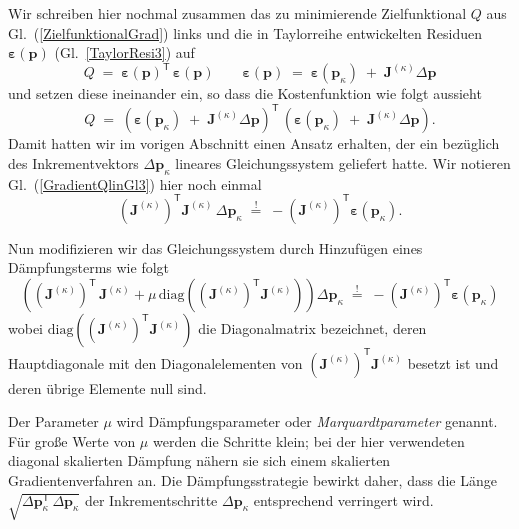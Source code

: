 Wir schreiben hier nochmal zusammen das zu minimierende Zielfunktional $Q$ aus Gl.~(\ref{ZielfunktionalGrad}) links
und die in Taylorreihe entwickelten Residuen $\boldsymbol{\varepsilon}(\mathbf{p})$
(Gl.~\ref{TaylorResi3}) auf
$$
Q \; = \; \boldsymbol{\varepsilon}(\mathbf{p})^\mathsf{T} \, \boldsymbol{\varepsilon}(\mathbf{p})
\qquad
\boldsymbol{\varepsilon}(\mathbf{p})
\; = \;
\boldsymbol{\varepsilon}(\mathbf{p}_\kappa)
\; + \; \boldsymbol{J}^{(\kappa)} \Delta \mathbf{p}
$$
und setzen diese ineinander ein, so dass die Kostenfunktion wie folgt aussieht
\begin{equation}
Q \; = \; \left( \boldsymbol{\varepsilon}(\mathbf{p}_\kappa)
\; + \; \boldsymbol{J}^{(\kappa)} \Delta \mathbf{p} \right)^\mathsf{T} \,
\left( \boldsymbol{\varepsilon}(\mathbf{p}_\kappa)
\; + \; \boldsymbol{J}^{(\kappa)} \Delta \mathbf{p} \right) .
\label{ZielfunktionalTaylorResi}
\end{equation}
Damit hatten wir im vorigen Abschnitt einen Ansatz erhalten, der
ein bezüglich des Inkrementvektors $\Delta \mathbf{p}_\kappa$ lineares Gleichungssystem
geliefert hatte. Wir notieren Gl.~(\ref{GradientQlinGl3}) hier noch einmal
\begin{equation*}
 \left(\boldsymbol{J}^{(\kappa)}\right)^\mathsf{T}
 \boldsymbol{J}^{(\kappa)} \, \Delta \mathbf{p}_\kappa
\; \overset{!}{=} \;
- \left(\boldsymbol{J}^{(\kappa)}\right)^\mathsf{T}
 \boldsymbol{\varepsilon}(\mathbf{p}_\kappa) .
\end{equation*}

Nun modifizieren wir das Gleichungssystem durch Hinzufügen eines Dämpfungsterms
wie folgt
\begin{equation}
\left(
\left(\boldsymbol{J}^{(\kappa)}\right)^\mathsf{T} \, \boldsymbol{J}^{(\kappa)}
 + \mu \, \mathrm{diag}\left(\left(\boldsymbol{J}^{(\kappa)}\right)^\mathsf{T}
 \boldsymbol{J}^{(\kappa)}\right)
 \right) \Delta \mathbf{p}_\kappa \;
\overset{!}{=} \; - \left(\boldsymbol{J}^{(\kappa)}\right)^\mathsf{T}
 \boldsymbol{\varepsilon}(\mathbf{p}_\kappa)
\label{ZielfunktionalGradTaylorResiDaempf}
\end{equation}
wobei $\mathrm{diag}\!\left(\left(\boldsymbol{J}^{(\kappa)}\right)^\mathsf{T}
\boldsymbol{J}^{(\kappa)}\right)$ die Diagonalmatrix bezeichnet, deren
Hauptdiagonale mit den Diagonalelementen von
$\left(\boldsymbol{J}^{(\kappa)}\right)^\mathsf{T}\boldsymbol{J}^{(\kappa)}$
besetzt ist und deren übrige Elemente null sind.

Der Parameter $\mu$ wird Dämpfungsparameter oder \textsl{Marquardtparameter} genannt.
Für große Werte von $\mu$ werden die Schritte klein; bei der hier verwendeten
diagonal skalierten Dämpfung nähern sie sich einem skalierten Gradientenverfahren an.
Die Dämpfungsstrategie bewirkt daher, dass die Länge
$\sqrt{\Delta \mathbf{p}_\kappa^\mathsf{T} \, \Delta \mathbf{p}_\kappa}$
der Inkrementschritte $\Delta \mathbf{p}_\kappa$ entsprechend verringert wird.

